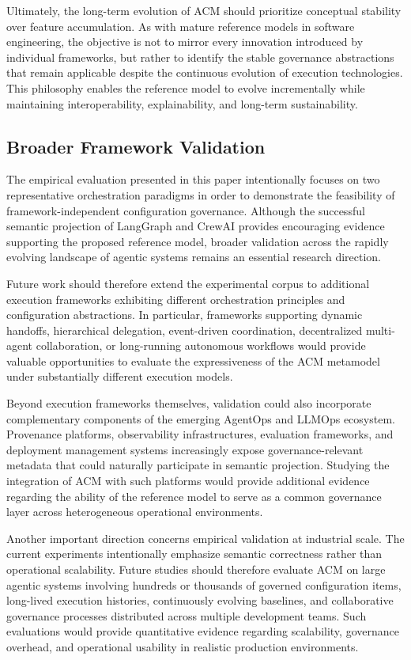 \documentclass[10pt]{article}
\begin{document}
Ultimately, the long-term evolution of ACM should prioritize conceptual stability over feature accumulation. As with mature reference models in software engineering, the objective is not to mirror every innovation introduced by individual frameworks, but rather to identify the stable governance abstractions that remain applicable despite the continuous evolution of execution technologies. This philosophy enables the reference model to evolve incrementally while maintaining interoperability, explainability, and long-term sustainability.

\subsection{Broader Framework Validation}
\label{sec:future_framework_validation}

The empirical evaluation presented in this paper intentionally focuses on two representative orchestration paradigms in order to demonstrate the feasibility of framework-independent configuration governance. Although the successful semantic projection of LangGraph and CrewAI provides encouraging evidence supporting the proposed reference model, broader validation across the rapidly evolving landscape of agentic systems remains an essential research direction.

Future work should therefore extend the experimental corpus to additional execution frameworks exhibiting different orchestration principles and configuration abstractions. In particular, frameworks supporting dynamic handoffs, hierarchical delegation, event-driven coordination, decentralized multi-agent collaboration, or long-running autonomous workflows would provide valuable opportunities to evaluate the expressiveness of the ACM metamodel under substantially different execution models.

Beyond execution frameworks themselves, validation could also incorporate complementary components of the emerging AgentOps and LLMOps ecosystem. Provenance platforms, observability infrastructures, evaluation frameworks, and deployment management systems increasingly expose governance-relevant metadata that could naturally participate in semantic projection. Studying the integration of ACM with such platforms would provide additional evidence regarding the ability of the reference model to serve as a common governance layer across heterogeneous operational environments.

Another important direction concerns empirical validation at industrial scale. The current experiments intentionally emphasize semantic correctness rather than operational scalability. Future studies should therefore evaluate ACM on large agentic systems involving hundreds or thousands of governed configuration items, long-lived execution histories, continuously evolving baselines, and collaborative governance processes distributed across multiple development teams. Such evaluations would provide quantitative evidence regarding scalability, governance overhead, and operational usability in realistic production environments.
\end{document}
